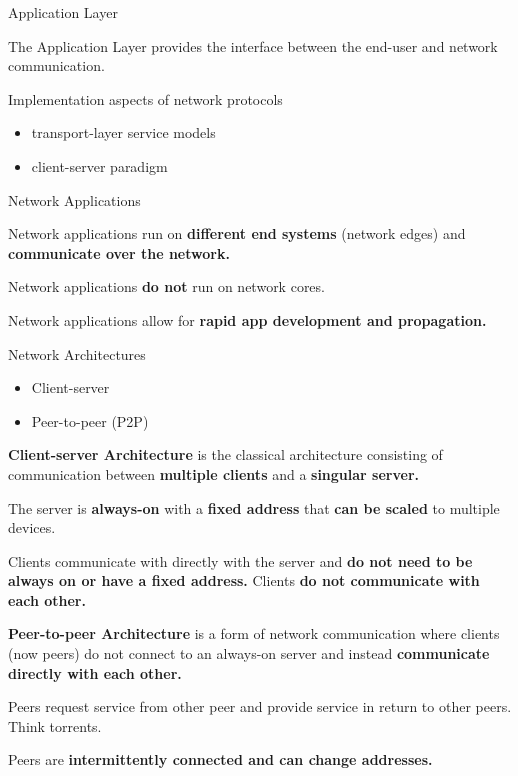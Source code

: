 \begin{topic}{Application Layer}

The Application Layer provides the interface between the end-user and network communication.

Implementation aspects of network protocols
\begin{itemize}
	\item transport-layer service models
	\item client-server paradigm
\end{itemize}

\end{topic}

\begin{topic}{Network Applications}

Network applications run on \textbf{different end systems} (network edges) and \textbf{communicate over the network.}

Network applications \textbf{do not} run on network cores.

Network applications allow for \textbf{rapid app development and propagation.}

\end{topic}

\begin{topic}{Network Architectures}

\begin{itemize}
	\item Client-server
	\item Peer-to-peer (P2P)
\end{itemize}

\begin{subtopic}{2}
\textbf{Client-server Architecture} is the classical architecture consisting of communication between \textbf{multiple clients} and a \textbf{singular server.}

The server is \textbf{always-on} with a \textbf{fixed address} that \textbf{can be scaled} to multiple devices.

Clients communicate with directly with the server and \textbf{do not need to be always on or have a fixed address.} Clients \textbf{do not communicate with each other.}
\end{subtopic}

\begin{subtopic}{3}
\textbf{Peer-to-peer Architecture} is a form of network communication where clients (now peers) do not connect to an always-on server and instead \textbf{communicate directly with each other.}

Peers request service from other peer and provide service in return to other peers. Think torrents.

Peers are \textbf{intermittently connected and can change addresses.}
\end{subtopic}

\end{topic}

